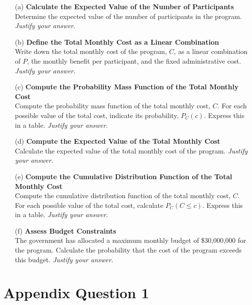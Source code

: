 \documentclass[11pt]{article}
\begin{document}
\begin{itemize}
    \item[(a)] \textbf{Calculate the Expected Value of the Number of Participants} \\
    Determine the expected value of the number of participants in the program. \emph{Justify your answer}.

    \item[(b)] \textbf{Define the Total Monthly Cost as a Linear Combination} \\
    Write down the total monthly cost of the program, $C$, as a linear combination of $P$, the monthly benefit per participant, and the fixed administrative cost. \emph{Justify your answer}.

    \item[(c)] \textbf{Compute the Probability Mass Function of the Total Monthly Cost} \\
    Compute the probability mass function of the total monthly cost, $C$. For each possible value of the total cost, indicate its probability, $P_C(c)$. Express this in a table. \emph{Justify your answer}.

    \item[(d)] \textbf{Compute the Expected Value of the Total Monthly Cost} \\
    Calculate the expected value of the total monthly cost of the program. \emph{Justify your answer}.

    \item[(e)] \textbf{Compute the Cumulative Distribution Function of the Total Monthly Cost} \\
    Compute the cumulative distribution function of the total monthly cost, $C$. For each possible value of the total cost, calculate $P_C(C \leq c)$. Express this in a table. \emph{Justify your answer}.

    \item[(f)] \textbf{Assess Budget Constraints} \\
    The government has allocated a maximum monthly budget of \$30,000,000 for the program. Calculate the probability that the cost of the program exceeds this budget. \emph{Justify your answer}.
\end{itemize}

\newpage
\section*{Appendix Question 1}
\end{document}
